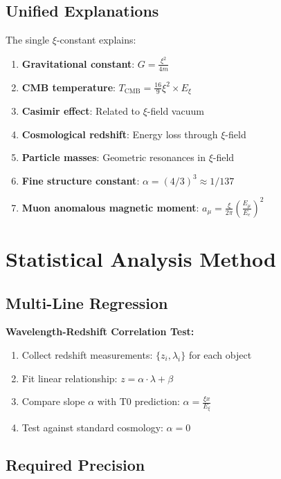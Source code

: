\documentclass[12pt,a4paper]{article}
\newcommand{\Exi}{E_\xi}
\theoremstyle{definition}
\begin{document}
	\subsection{Unified Explanations}
	
	The single $\xi$-constant explains:
	\begin{enumerate}
		\item \textbf{Gravitational constant}: $G = \frac{\xi^2}{4m}$
		\item \textbf{CMB temperature}: $T_{\text{CMB}} = \frac{16}{9} \xi^2 \times E_\xi$
		\item \textbf{Casimir effect}: Related to $\xi$-field vacuum
		\item \textbf{Cosmological redshift}: Energy loss through $\xi$-field
		\item \textbf{Particle masses}: Geometric resonances in $\xi$-field
		\item \textbf{Fine structure constant}: $\alpha = (4/3)^3 \approx 1/137$
		\item \textbf{Muon anomalous magnetic moment}: $a_\mu = \frac{\xi}{2\pi} \left(\frac{E_\mu}{E_e}\right)^2$
	\end{enumerate}
	
	\section{Statistical Analysis Method}
	
	\subsection{Multi-Line Regression}
	
	\begin{experiment}
		\textbf{Wavelength-Redshift Correlation Test:}
		\begin{enumerate}
			\item Collect redshift measurements: $\{z_i, \lambda_i\}$ for each object
			\item Fit linear relationship: $z = \alpha \cdot \lambda + \beta$
			\item Compare slope $\alpha$ with T0 prediction: $\alpha = \frac{\xi x}{\Exi}$
			\item Test against standard cosmology: $\alpha = 0$
		\end{enumerate}
	\end{experiment}
	
	\subsection{Required Precision}
	
\end{document}
